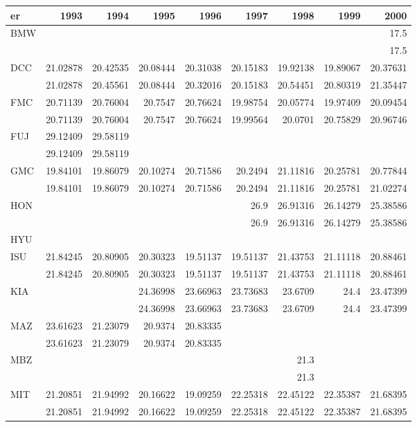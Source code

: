 \begin{tabular}{lrrrrrrrr}
\toprule
er & 1993 & 1994 & 1995 & 1996 & 1997 & 1998 & 1999 & 2000 \\
\midrule
BMW &  &  &  &  &  &  &  & 17.5 \\
 &  &  &  &  &  &  &  & 17.5 \\
DCC & 21.02878 & 20.42535 & 20.08444 & 20.31038 & 20.15183 & 19.92138 & 19.89067 & 20.37631 \\
 & 21.02878 & 20.45561 & 20.08444 & 20.32016 & 20.15183 & 20.54451 & 20.80319 & 21.35447 \\
FMC & 20.71139 & 20.76004 & 20.7547 & 20.76624 & 19.98754 & 20.05774 & 19.97409 & 20.09454 \\
 & 20.71139 & 20.76004 & 20.7547 & 20.76624 & 19.99564 & 20.0701 & 20.75829 & 20.96746 \\
FUJ & 29.12409 & 29.58119 &  &  &  &  &  &  \\
 & 29.12409 & 29.58119 &  &  &  &  &  &  \\
GMC & 19.84101 & 19.86079 & 20.10274 & 20.71586 & 20.2494 & 21.11816 & 20.25781 & 20.77844 \\
 & 19.84101 & 19.86079 & 20.10274 & 20.71586 & 20.2494 & 21.11816 & 20.25781 & 21.02274 \\
HON &  &  &  &  & 26.9 & 26.91316 & 26.14279 & 25.38586 \\
 &  &  &  &  & 26.9 & 26.91316 & 26.14279 & 25.38586 \\
HYU &  &  &  &  &  &  &  &  \\
ISU & 21.84245 & 20.80905 & 20.30323 & 19.51137 & 19.51137 & 21.43753 & 21.11118 & 20.88461 \\
 & 21.84245 & 20.80905 & 20.30323 & 19.51137 & 19.51137 & 21.43753 & 21.11118 & 20.88461 \\
KIA &  &  & 24.36998 & 23.66963 & 23.73683 & 23.6709 & 24.4 & 23.47399 \\
 &  &  & 24.36998 & 23.66963 & 23.73683 & 23.6709 & 24.4 & 23.47399 \\
MAZ & 23.61623 & 21.23079 & 20.9374 & 20.83335 &  &  &  &  \\
 & 23.61623 & 21.23079 & 20.9374 & 20.83335 &  &  &  &  \\
MBZ &  &  &  &  &  & 21.3 &  &  \\
 &  &  &  &  &  & 21.3 &  &  \\
MIT & 21.20851 & 21.94992 & 20.16622 & 19.09259 & 22.25318 & 22.45122 & 22.35387 & 21.68395 \\
 & 21.20851 & 21.94992 & 20.16622 & 19.09259 & 22.25318 & 22.45122 & 22.35387 & 21.68395 \\

\end{tabular}
